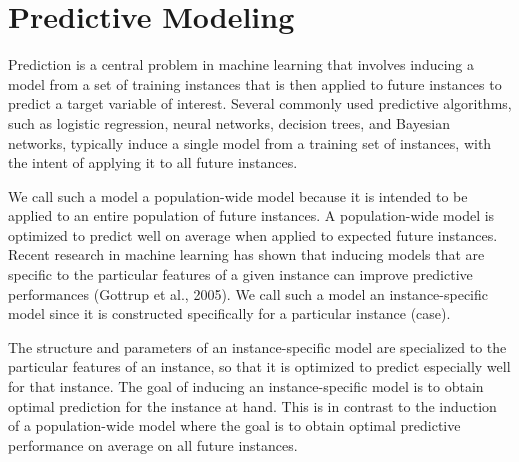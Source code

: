 \documentclass[caret-main.tex]{subfiles}
\begin{document}
\section{Predictive Modeling}

Prediction is a central problem in machine learning that involves inducing a model from a set of
training instances that is then applied to future instances to predict a target variable of interest.
Several commonly used predictive algorithms, such as logistic regression, neural networks, decision
trees, and Bayesian networks, typically induce a single model from a training set of instances, with
the intent of applying it to all future instances. 


We call such a model a population-wide model because it is intended to be applied to an entire population of future instances. A population-wide
model is optimized to predict well on average when applied to expected future instances.
Recent research in machine learning has shown that inducing models that are speciﬁc to the
particular features of a given instance can improve predictive performances (Gottrup et al., 2005).
We call such a model an instance-speciﬁc model since it is constructed speciﬁcally for a particular
instance (case). 

The structure and parameters of an instance-speciﬁc model are specialized to the
particular features of an instance, so that it is optimized to predict especially well for that instance.
The goal of inducing an instance-speciﬁc model is to obtain optimal prediction for the instance at
hand. This is in contrast to the induction of a population-wide model where the goal is to obtain
optimal predictive performance on average on all future instances.



\end{document}
